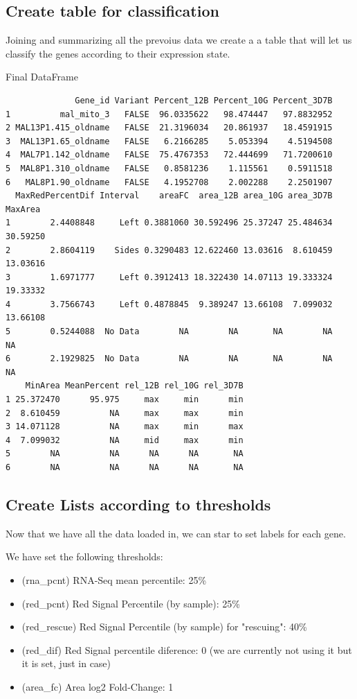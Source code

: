 \documentclass[11pt]{article}
\begin{document}
\subsection{Create table for classification}
\label{sec:org40939d6}
Joining and summarizing all the prevoius data we create a a table that will let us classify the genes according to their expression state.

Final DataFrame
\begin{verbatim}
              Gene_id Variant Percent_12B Percent_10G Percent_3D7B
1          mal_mito_3   FALSE  96.0335622   98.474447   97.8832952
2 MAL13P1.415_oldname   FALSE  21.3196034   20.861937   18.4591915
3  MAL13P1.65_oldname   FALSE   6.2166285    5.053394    4.5194508
4  MAL7P1.142_oldname   FALSE  75.4767353   72.444699   71.7200610
5  MAL8P1.310_oldname   FALSE   0.8581236    1.115561    0.5911518
6   MAL8P1.90_oldname   FALSE   4.1952708    2.002288    2.2501907
  MaxRedPercentDif Interval    areaFC  area_12B area_10G area_3D7B  MaxArea
1        2.4408848     Left 0.3881060 30.592496 25.37247 25.484634 30.59250
2        2.8604119    Sides 0.3290483 12.622460 13.03616  8.610459 13.03616
3        1.6971777     Left 0.3912413 18.322430 14.07113 19.333324 19.33332
4        3.7566743     Left 0.4878845  9.389247 13.66108  7.099032 13.66108
5        0.5244088  No Data        NA        NA       NA        NA       NA
6        2.1929825  No Data        NA        NA       NA        NA       NA
    MinArea MeanPercent rel_12B rel_10G rel_3D7B
1 25.372470      95.975     max     min      min
2  8.610459          NA     max     max      min
3 14.071128          NA     max     min      max
4  7.099032          NA     mid     max      min
5        NA          NA      NA      NA       NA
6        NA          NA      NA      NA       NA
\end{verbatim}

\subsection{Create Lists according to thresholds}
\label{sec:org3698ebe}

Now that we have all the data loaded in, we can star to set labels for each gene.

We have set the following thresholds:
\begin{itemize}
\item (rna\_pcnt) RNA-Seq mean percentile: 25\%
\item (red\_pcnt) Red Signal Percentile (by sample): 25\%
\item (red\_rescue) Red Signal Percentile (by sample) for "rescuing": 40\%
\item (red\_dif) Red Signal percentile diference: 0 (we are currently not using it but it is set, just in case)
\item (area\_fc) Area log2 Fold-Change: 1
\end{itemize}
\end{document}
